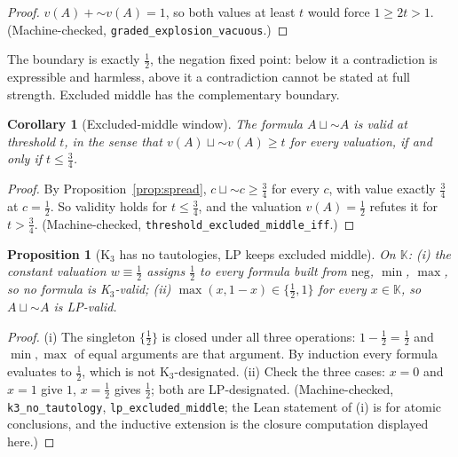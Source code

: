 \documentclass[11pt,a4paper]{article}
\newtheorem{proposition}[theorem]{Proposition}
\newtheorem{corollary}[theorem]{Corollary}
\newcommand{\negc}{\mathord{\sim}}
\newcommand{\disjc}{\sqcup}
\newcommand{\Kl}{\mathbb{K}}
\begin{document}
\begin{proof}
$v(A) + \negc v(A) = 1$, so both values at least $t$ would force
$1 \geq 2t > 1$.
(Machine-checked, \texttt{graded\_explosion\_vacuous}.)
\end{proof}

The boundary is exactly $\tfrac{1}{2}$, the negation fixed point:
below it a contradiction is expressible and harmless, above it a
contradiction cannot be stated at full strength.
Excluded middle has the complementary boundary.

\begin{corollary}[Excluded-middle window]
\label{cor:tnd}
The formula $A \disjc \negc A$ is valid at threshold $t$, in the
sense that $v(A) \disjc \negc v(A) \geq t$ for every valuation, if
and only if $t \leq \tfrac{3}{4}$.
\end{corollary}

\begin{proof}
By Proposition~\ref{prop:spread},
$c \disjc \negc c \geq \tfrac{3}{4}$ for every $c$, with value
exactly $\tfrac{3}{4}$ at $c = \tfrac{1}{2}$.
So validity holds for $t \leq \tfrac{3}{4}$, and the valuation
$v(A) = \tfrac{1}{2}$ refutes it for $t > \tfrac{3}{4}$.
(Machine-checked, \texttt{threshold\_excluded\_middle\_iff}.)
\end{proof}

\begin{proposition}[K$_3$ has no tautologies, LP keeps excluded middle]
\label{prop:k3-lp}
On $\Kl$:
(i) the constant valuation $w \equiv \tfrac{1}{2}$ assigns
$\tfrac{1}{2}$ to every formula built from $\mathrm{neg}$, $\min$,
$\max$, so no formula is K$_3$-valid;
(ii) $\max(x, 1-x) \in \{\tfrac{1}{2}, 1\}$ for every $x \in \Kl$,
so $A \disjc \negc A$ is LP-valid.
\end{proposition}

\begin{proof}
(i) The singleton $\{\tfrac{1}{2}\}$ is closed under all three
operations: $1 - \tfrac{1}{2} = \tfrac{1}{2}$ and
$\min, \max$ of equal arguments are that argument.
By induction every formula evaluates to $\tfrac{1}{2}$, which is not
K$_3$-designated.
(ii) Check the three cases: $x = 0$ and $x = 1$ give $1$,
$x = \tfrac{1}{2}$ gives $\tfrac{1}{2}$; both are LP-designated.
(Machine-checked, \texttt{k3\_no\_tautology},
\texttt{lp\_excluded\_middle}; the Lean statement of (i) is for
atomic conclusions, and the inductive extension is the closure
computation displayed here.)
\end{proof}
\end{document}
